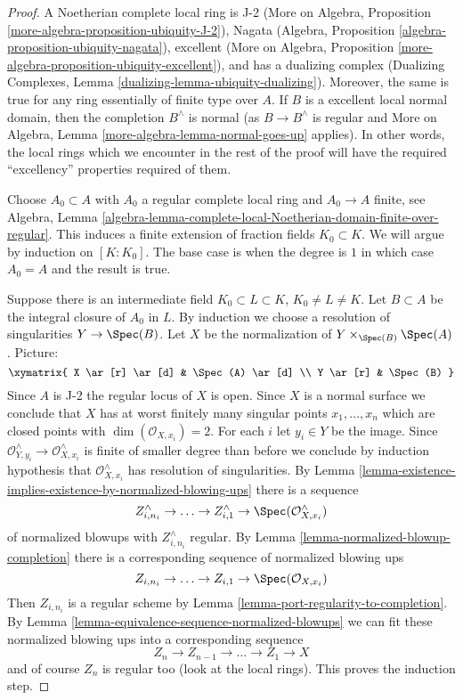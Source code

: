\begin{proof}
A Noetherian complete local ring is J-2
(More on Algebra, Proposition \ref{more-algebra-proposition-ubiquity-J-2}),
Nagata (Algebra, Proposition \ref{algebra-proposition-ubiquity-nagata}),
excellent (More on Algebra, Proposition
\ref{more-algebra-proposition-ubiquity-excellent}),
and has a dualizing complex
(Dualizing Complexes, Lemma \ref{dualizing-lemma-ubiquity-dualizing}).
Moreover, the same is true for any ring essentially of finite type over $A$.
If $B$ is a excellent local normal domain, then the completion
$B^\wedge$ is normal (as $B \to B^\wedge$ is regular and
More on Algebra, Lemma \ref{more-algebra-lemma-normal-goes-up} applies).
In other words, the local rings which we encounter in the rest of the proof
will have the required ``excellency'' properties required of them.

\medskip\noindent
Choose $A_0 \subset A$ with $A_0$ a regular complete local ring
and $A_0 \to A$ finite, see Algebra, Lemma
\ref{algebra-lemma-complete-local-Noetherian-domain-finite-over-regular}.
This induces a finite extension of fraction fields $K_0 \subset K$.
We will argue by induction on $[K : K_0]$. The base case is
when the degree is $1$ in which case $A_0 = A$ and the result is true.

\medskip\noindent
Suppose there is an intermediate field $K_0 \subset L \subset K$,
$K_0 \not = L \not = K$. Let $B \subset A$ be the integral closure
of $A_0$ in $L$. By induction we choose a resolution of singularities
$Y \to \Spec(B)$. Let $X$ be the normalization
of $Y \times_{\Spec(B)} \Spec(A)$. Picture:
$$
\xymatrix{
X \ar[r] \ar[d] & \Spec(A) \ar[d] \\
Y \ar[r] & \Spec(B)
}
$$
Since $A$ is J-2 the regular locus of $X$ is open. Since $X$
is a normal surface we conclude that $X$ has at worst finitely
many singular points $x_1, \ldots, x_n$ which are closed points with
$\dim(\mathcal{O}_{X, x_i}) = 2$.
For each $i$ let $y_i \in Y$ be the image.
Since
$\mathcal{O}_{Y, y_i}^\wedge \to \mathcal{O}_{X, x_i}^\wedge$
is finite of smaller degree than before we conclude by
induction hypothesis that $\mathcal{O}_{X, x_i}^\wedge$
has resolution of singularities. By
Lemma \ref{lemma-existence-implies-existence-by-normalized-blowing-ups}
there is a sequence
$$
Z^\wedge_{i, n_i} \to \ldots \to Z^\wedge_{i, 1} \to
\Spec(\mathcal{O}_{X, x_i}^\wedge)
$$
of normalized blowups with $Z^\wedge_{i, n_i}$ regular.
By Lemma \ref{lemma-normalized-blowup-completion}
there is a corresponding sequence of normalized blowing ups
$$
Z_{i, n_i} \to \ldots \to Z_{i, 1} \to \Spec(\mathcal{O}_{X, x_i})
$$
Then $Z_{i, n_i}$ is a regular scheme by
Lemma \ref{lemma-port-regularity-to-completion}.
By Lemma \ref{lemma-equivalence-sequence-normalized-blowups}
we can fit these normalized blowing ups
into a corresponding sequence
$$
Z_n \to Z_{n - 1} \to \ldots \to Z_1 \to X
$$
and of course $Z_n$ is regular too (look at the local rings).
This proves the induction step.


\end{proof}
